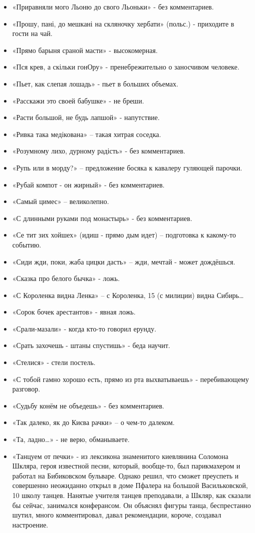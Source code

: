 \begin{itemize}
\item  «Приравняли мого Льоню до свого Льоньки» - без комментариев.
\item  «Прошу, пані, до мешкані на скляночку хербати» (польс.) - приходите в гости на чай.
\item  «Прямо барыня сраной масти» - высокомерная.
\item  «Пся крев, а скільки гонОру» - пренебрежительно о заносчивом человеке.
\item  «Пьет, как слепая лошадь» - пьет в больших объемах.
\item  «Расскажи это своей бабушке» - не бреши.
\item  «Расти большой, не будь лапшой» - напутствие.
\item  «Ривка така медікована» – такая хитрая соседка.
\item  «Розумному лихо, дурному радість» - без комментариев.
\item  «Рупь или в морду?» – предложение босяка к кавалеру гуляющей парочки.
\item  «Рубай компот - он жирный» - без комментариев.
\item  «Самый цимес» – великолепно.
\item  «С длинными руками под монастырь» - без комментариев.
\item  «Се тит зих хойшех» (идиш - прямо дым идет) – подготовка к какому-то 
событию.
\item  «Сиди жди, поки, жаба цицки дасть» – жди, мечтай - может дождёшься.
\item  «Сказка про белого бычка»  - ложь.
\item  «С Короленка видна Ленка» – с Короленка, 15 (с милиции) видна Сибирь…
\item  «Сорок бочек арестантов» - явная ложь.
\item  «Срали-мазали» - когда кто-то говорил ерунду.
\item  «Срать захочешь - штаны спустишь» - беда научит.
\item  «Стелися» - стели постель.
\item  «С тобой гамно хорошо есть, прямо из рта выхватываешь» - перебивающему разговор.
\item  «Судьбу конём не объедешь» - без комментариев.
\item  «Так далеко, як до Києва рачки» – о чем-то далеком.
\item  «Та, ладно…» - не верю, обманываете.
\item  «Танцуем от печки» - из лексикона знаменитого киевлянина Соломона Шкляра, героя известной песни, который, вообще-то, был парикмахером и работал на Бибиковском бульваре. Однако решил, что сможет преуспеть и совершенно неожиданно открыл в доме Пфалера на большой Васильковской, 10 школу танцев. Нанятые учителя танцев преподавали, а Шкляр, как сказали бы сейчас, занимался конферансом. Он объяснял фигуры танца, беспрестанно шутил, много комментировал, давал рекомендации, короче, создавал настроение. 

\end{itemize}
